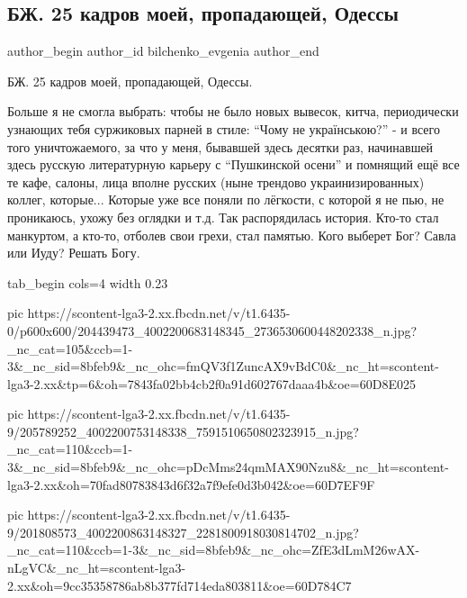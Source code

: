  
 
 
 
 
 
\subsection{БЖ. 25 кадров моей, пропадающей, Одессы}
\label{sec:23_06_2021.fb.bilchenko_evgenia.1.odessa_foto}
\ifcmt
 author_begin
   author_id bilchenko_evgenia
 author_end
\fi

БЖ. 25 кадров моей, пропадающей, Одессы.

Больше я не смогла выбрать: чтобы не было новых вывесок, китча, периодически
узнающих тебя суржиковых парней в стиле: \enquote{Чому не українською?} - и всего того
уничтожаемого, за что у меня, бывавшей здесь десятки раз, начинавшей здесь
русскую литературную карьеру с \enquote{Пушкинской осени} и помнящий ещё все те кафе,
салоны, лица вполне русских (ныне трендово украинизированных) коллег,
которые... Которые уже все поняли по лёгкости, с которой я не пью, не
проникаюсь, ухожу без оглядки и т.д. Так распорядилась история. Кто-то стал
манкуртом, а кто-то, отболев свои грехи, стал памятью. Кого выберет Бог? Савла
или Иуду? Решать Богу.


\ifcmt
  tab_begin cols=4
  width 0.23

     pic https://scontent-lga3-2.xx.fbcdn.net/v/t1.6435-0/p600x600/204439473_4002200683148345_2736530600448202338_n.jpg?_nc_cat=105&ccb=1-3&_nc_sid=8bfeb9&_nc_ohc=fmQV3f1ZuncAX9vBdC0&_nc_ht=scontent-lga3-2.xx&tp=6&oh=7843fa02bb4cb2f0a91d602767daaa4b&oe=60D8E025

     pic https://scontent-lga3-2.xx.fbcdn.net/v/t1.6435-9/205789252_4002200753148338_7591510650802323915_n.jpg?_nc_cat=110&ccb=1-3&_nc_sid=8bfeb9&_nc_ohc=pDcMms24qmMAX90Nzu8&_nc_ht=scontent-lga3-2.xx&oh=70fad80783843d6f32a7f9efe0d3b042&oe=60D7EF9F

     pic https://scontent-lga3-2.xx.fbcdn.net/v/t1.6435-9/201808573_4002200863148327_2281800918030814702_n.jpg?_nc_cat=110&ccb=1-3&_nc_sid=8bfeb9&_nc_ohc=ZfE3dLmM26wAX-nLgVC&_nc_ht=scontent-lga3-2.xx&oh=9cc35358786ab8b377fd714eda803811&oe=60D784C7

